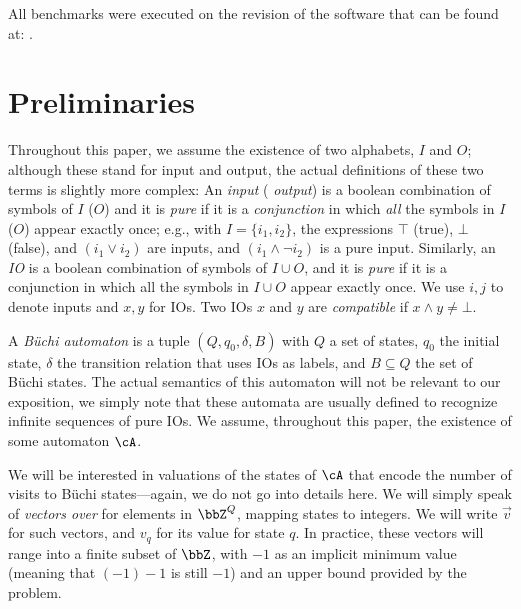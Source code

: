\documentclass[runningheads,a4paper]{llncs}
\begin{document}
All benchmarks were executed on the revision of the software that can be found at:
.

\section{Preliminaries}

Throughout this paper, we assume the existence of two alphabets, \(I\) and
\(O\); although these stand for input and output, the actual definitions of
these two terms is slightly more complex: An \emph{input} (\resp
\emph{output}) is a boolean combination of symbols of \(I\) (\resp $O$) and it
is \emph{pure} if it is a \emph{conjunction} in which \emph{all} the symbols
in \(I\) (\resp $O$) appear exactly once; e.g., with \(I = \{i_1, i_2\}\), the
expressions \(\top\) (true), \(\bot\) (false), and \((i_1 \lor i_2)\) are
inputs, and \((i_1 \land \neg i_2)\) is a pure input. Similarly, an \emph{IO}
is a boolean combination of symbols of \(I \cup O\), and it is \emph{pure} if
it is a conjunction in which all the symbols in \(I \cup O\) appear exactly
once.  We use \(i, j\) to denote inputs and \(x, y\) for IOs.  Two IOs \(x\)
and \(y\) are \emph{compatible} if \(x \land y \neq \bot\).

A \emph{Büchi automaton} \cA is a tuple \((Q, q_0, \delta, B)\) with \(Q\) a
set of states, \(q_0\) the initial state, \(\delta\) the transition relation
that uses IOs as labels, and \(B \subseteq Q\) the set of Büchi states.  The
actual semantics of this automaton will not be relevant to our exposition, we
simply note that these automata are usually defined to recognize infinite
sequences of pure IOs.  We assume, throughout this paper, the existence of
some automaton \(\cA\).

We will be interested in valuations of the states of \(\cA\) that encode the
number of visits to
Büchi states---again, we do not go into details
here.  We will simply speak of \emph{vectors over \cA} for elements in
\(\bbZ^Q\), mapping states to integers.  We will write \(\vec{v}\) for such vectors,
and \(v_q\) for its value for state \(q\).  In practice, these vectors will range
into a finite subset of \(\bbZ\), with \(-1\) as an implicit minimum value (meaning
that \((-1) - 1\) is still \(-1\)) and an upper bound provided by the problem.
\end{document}
